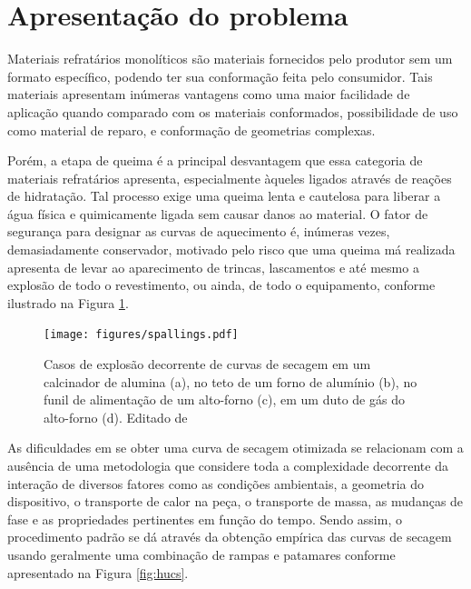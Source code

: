 \section{Apresentação do problema}
   Materiais refratários monolíticos são materiais fornecidos pelo produtor
   sem um formato específico, podendo ter sua conformação feita pelo consumidor. Tais
   materiais apresentam inúmeras vantagens como uma maior facilidade de
   aplicação quando comparado com os materiais conformados, possibilidade de uso
   como material de reparo, e conformação de geometrias complexas.

   Porém, a etapa de queima é a principal desvantagem que essa
   categoria de materiais refratários apresenta, especialmente àqueles ligados
   através de reações de hidratação. Tal processo exige uma queima
   lenta e cautelosa para liberar a água física e quimicamente ligada sem causar
   danos ao material. O fator de segurança para designar as curvas de
   aquecimento é, inúmeras vezes, demasiadamente conservador, motivado pelo risco que
   uma queima má realizada apresenta de levar ao aparecimento de trincas, lascamentos e até mesmo a explosão de todo o revestimento, ou ainda, de todo o equipamento,
   conforme ilustrado na Figura \ref{fig:spalls}.
    
    \begin{figure}[!ht]
        \centering
        \texttt{[image: figures/spallings.pdf]}
        \caption{Casos de explosão decorrente de curvas de secagem em um
          calcinador de alumina (a), no teto de um forno de alumínio (b), no
          funil de alimentação de um alto-forno (c), em um duto de gás do
          alto-forno (d). Editado de \cite{irish}}
        \label{fig:spalls}
   \end{figure}

   As dificuldades em se obter uma curva de secagem otimizada se relacionam com
   a ausência de uma metodologia que considere toda a complexidade decorrente da
   interação de diversos fatores como as condições ambientais, a geometria do
   dispositivo, o transporte de calor na peça, o transporte de massa, as
   mudanças de fase e as propriedades pertinentes em função do tempo. Sendo
   assim, o procedimento padrão se dá através da obtenção empírica das curvas de
   secagem usando geralmente uma combinação de rampas e patamares conforme
   apresentado na Figura \ref{fig:hucs}.
      
